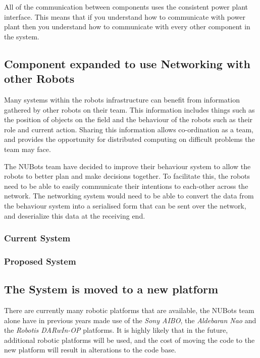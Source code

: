 \documentclass[english,12pt]{scrartcl}
\begin{document}
				All of the communication between components uses the consistent power plant interface. This means that if you
				understand how to communicate with power plant then you understand how to communicate with every other component
				in the system.


		\subsection{Component expanded to use Networking with other Robots}
			Many systems within the robots infrastructure can benefit from information gathered
			by other robots on their team. This information includes things such as the position of
			objects on the field and the behaviour of the robots such as their role and current
			action. Sharing this information allows co-ordination as a team, and provides the
			opportunity for distributed computing on difficult problems the team may face.

			The NUBots team have decided to improve their behaviour system to allow the robots to
			better plan and make decisions together. To facilitate this, the robots need to be able
			to easily communicate their intentions to each-other across the network. The networking
			system would need to be able to convert the data from the behaviour system into a
			serialised form that can be sent over the network, and deserialize this data at the
			receiving end.

			\subsubsection{Current System}
			\subsubsection{Proposed System}

		\subsection{The System is moved to a new platform}
			There are currently many robotic platforms that are available, the NUBots team alone
			have in previous years made use of the \emph{Sony AIBO}, the \emph{Aldebaran Nao} and
			the \emph{Robotis DARwIn-OP} platforms. It is highly likely that in the future,
			additional robotic platforms will be used, and the cost of moving the code to the new
			platform will result in alterations to the code base.
\end{document}
